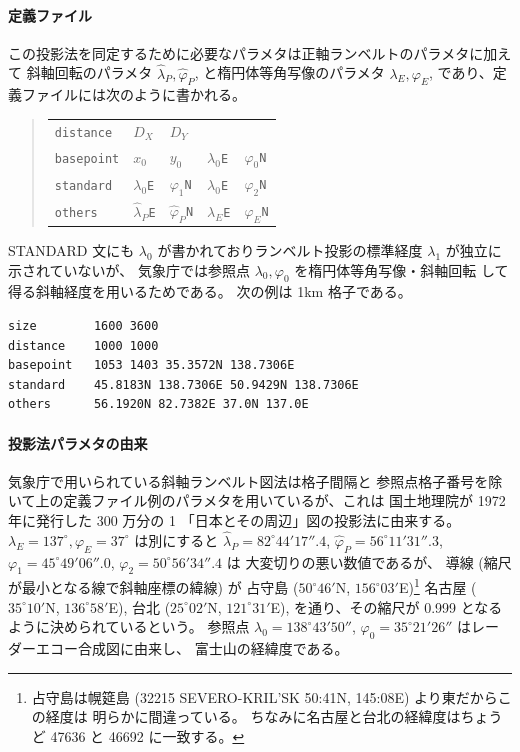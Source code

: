 \paragraph{定義ファイル}

この投影法を同定するために必要なパラメタは正軸ランベルトのパラメタに加えて
斜軸回転のパラメタ
\(\hat\lambda_P, \hat\varphi_P\),
と楕円体等角写像のパラメタ
\(\lambda_E, \varphi_E\),
であり、定義ファイルには次のように書かれる。
\begin{quote}
\begin{tabular}{lllll}
{\tt distance}	& $D_X$ & $D_Y$ & & \\
{\tt basepoint}	& $x_0$ & $y_0$	& $\lambda_0${\tt E} & $\varphi_0${\tt N} \\
{\tt standard}	& $\lambda_0${\tt E} & $\varphi_1${\tt N} &
	$\lambda_0${\tt E} & $\varphi_2${\tt N} \\
{\tt others} & $\hat\lambda_P${\tt E} & $\hat\varphi_P${\tt N} &
	$\lambda_E${\tt E} & $\varphi_E${\tt N} \\
\end{tabular}
\end{quote}
STANDARD 文にも $\lambda_0$ が書かれておりランベルト投影の標準経度
\(\lambda_1\)
が独立に示されていないが、
気象庁では参照点 \(\lambda_0, \varphi_0\) を楕円体等角写像・斜軸回転
して得る斜軸経度を用いるためである。
%
次の例は 1km 格子である。
%
\begin{screen}
\begin{verbatim}
size        1600 3600
distance    1000 1000
basepoint   1053 1403 35.3572N 138.7306E
standard    45.8183N 138.7306E 50.9429N 138.7306E
others      56.1920N 82.7382E 37.0N 137.0E
\end{verbatim}
\end{screen}

\paragraph{投影法パラメタの由来}

気象庁で用いられている斜軸ランベルト図法は格子間隔と
参照点格子番号を除いて上の定義ファイル例のパラメタを用いているが、これは
国土地理院が 1972 年に発行した
300 万分の 1 「日本とその周辺」図の投影法に由来する。
\(
	\lambda_E = 137^\circ, \varphi_E = 37^\circ
\)
は別にすると
\( \hat\lambda_P = 82^\circ44'17''.4 \),
\( \hat\varphi_P = 56^\circ11'31''.3 \),
\( \varphi_1 = 45^\circ49'06''.0 \),
\( \varphi_2 = 50^\circ56'34''.4 \)
は
大変切りの悪い数値であるが、
導線 (縮尺が最小となる線で斜軸座標の緯線) が
占守島 (\(50^\circ46'\)N, \(156^\circ03'\)E)\footnote{
	占守島は幌筵島
	(32215 SEVERO-KRIL'SK 50:41N, 145:08E) より東だからこの経度は
	明らかに間違っている。
	ちなみに名古屋と台北の経緯度はちょうど 47636 と 46692 に一致する。
}
名古屋 (\(35^\circ10'\)N, \(136^\circ58'\)E),
台北 (\(25^\circ02'\)N, \(121^\circ31'\)E),
を通り、その縮尺が 0.999 となるように決められているという\cite{kanazawa}。
参照点
\(\lambda_0 = 138^\circ43'50''\),
\(\varphi_0 = 35^\circ21'26''\)
はレーダーエコー合成図に由来し、
富士山の経緯度である\cite{makihara}。

